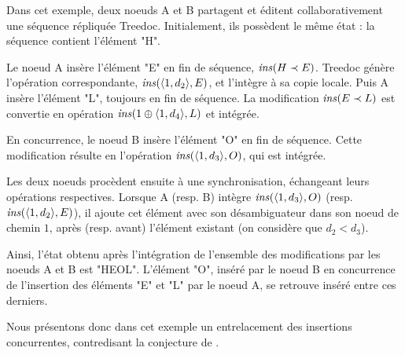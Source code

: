 Dans cet exemple, deux noeuds A et B partagent et éditent collaborativement une séquence répliquée Treedoc.
Initialement, ils possèdent le même état : la séquence contient l'élément "H".

Le noeud A insère l'élément "E" en fin de séquence, \ie $\mathit{ins}(H \prec E)$.
Treedoc génère l'opération correspondante, $\mathit{ins}(\langle 1,d_2 \rangle, E)$, et l'intègre à sa copie locale.
Puis A insère l'élément "L", toujours en fin de séquence.
La modification $\mathit{ins}(E \prec L)$ est convertie en opération $\mathit{ins}(1 \oplus \langle 1,d_4 \rangle, L)$ et intégrée.

En concurrence, le noeud B insère l'élément "O" en fin de séquence.
Cette modification résulte en l'opération $\mathit{ins}(\langle 1,d_3 \rangle, O)$, qui est intégrée.

Les deux noeuds procèdent ensuite à une synchronisation, échangeant leurs opérations respectives.
Lorsque A (resp. B) intègre $\mathit{ins}(\langle 1,d_3 \rangle, O)$ (resp. $\mathit{ins}(\langle 1,d_2 \rangle, E)$), il ajoute cet élément avec son désambiguateur dans son noeud de chemin $1$, après (resp. avant) l'élément existant (on considère que $d_2 < d_3$).

Ainsi, l'état obtenu après l'intégration de l'ensemble des modifications par les noeuds A et B est "HEOL".
L'élément "O", inséré par le noeud B en concurrence de l'insertion des éléments "E" et "L" par le noeud A, se retrouve inséré entre ces derniers.

Nous présentons donc dans cet exemple un entrelacement des insertions concurrentes, contredisant la conjecture de \cite{2019-interleaving-anomalies-collaborative-editors-kleppmann}.
